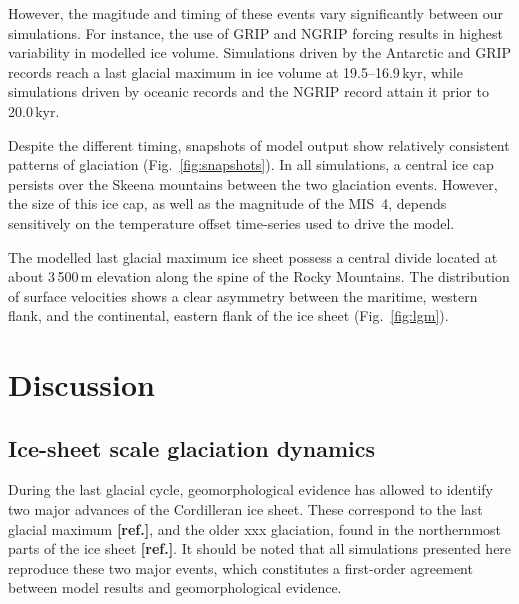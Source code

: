 \documentclass[tc, ms]{copernicus}
\newcommand{\aref}[0]{\textbf{[ref.]}}
\begin{document}
However, the magitude and timing of these events vary significantly
between our simulations. For instance, the use of GRIP and NGRIP forcing
results in highest variability in modelled ice volume. Simulations driven by
the Antarctic and GRIP records reach a last glacial maximum in ice volume at
19.5--16.9\,\unit{kyr}, while simulations driven by oceanic records
and the NGRIP record attain it prior to 20.0\,\unit{kyr}.

Despite the different timing,
snapshots of model output show relatively consistent patterns of glaciation
(Fig.~\ref{fig:snapshots}). In all simulations, a central ice cap persists over
the Skeena mountains between the two glaciation events. However, the size of
this ice cap, as well as the magnitude of the MIS~4, depends sensitively on the temperature
offset time-series used to drive the model.

The modelled last glacial maximum ice sheet possess a central divide located at
about 3\,500\,\unit{m} elevation along the spine of the Rocky Mountains. The
distribution of surface velocities shows a clear asymmetry between the
maritime, western flank, and the continental, eastern flank of the ice sheet
(Fig.~\ref{fig:lgm}).

\section{Discussion}
\label{sec:discussion}

\subsection{Ice-sheet scale glaciation dynamics}

During the last glacial cycle, geomorphological evidence has allowed to
identify two major advances of the Cordilleran ice sheet. These correspond to
the last glacial maximum \aref, and the older xxx glaciation, found in the
northernmost parts of the ice sheet \aref. It should be noted that all
simulations presented here reproduce these two major events, which constitutes
a first-order agreement between model results and geomorphological evidence.
\end{document}
